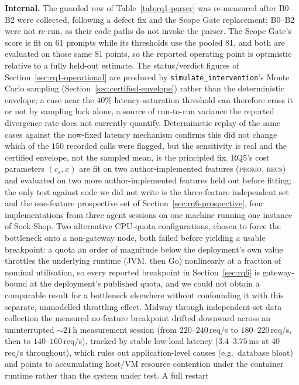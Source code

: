 \documentclass[journal, 10pt]{IEEEtran}
\begin{document}
\textbf{Internal.} The guarded row of Table~\ref{tab:rq1-parser} was re-measured after
B0--B2 were collected, following a defect fix and the Scope Gate replacement;
B0--B2 were not re-run, as their code paths do not invoke the parser. The Scope
Gate's score is fit on 61 prompts while its thresholds use the pooled 81, and
both are evaluated on those same 81 points, so the reported operating point is
optimistic relative to a fully held-out estimate. The status/verdict figures of
Section~\ref{sec:rq1-operational} are produced by \texttt{simulate\_intervention}'s
Monte Carlo sampling (Section~\ref{sec:certified-envelope}) rather than the
deterministic envelope; a case near the $40\%$ latency-saturation threshold can
therefore cross it or not by sampling luck alone, a source of run-to-run
variance the reported divergence rate does not currently quantify. Deterministic
replay of the same cases against the now-fixed latency mechanism confirms this
did not change which of the $150$ recorded calls were flagged, but the
sensitivity is real and the certified envelope, not the sampled mean, is the
principled fix. RQ5's cost parameters $(c_s, x)$ are fit on two
author-implemented features (\textsc{promo}, \textsc{recs}) and evaluated on
two more author-implemented features held out before fitting; the only test
against code we did not write is the three-feature independent set and the
one-feature prospective set of Section~\ref{sec:rq6-prospective}, four
implementations from three agent sessions on one machine running one instance
of Sock Shop. Two alternative CPU-quota configurations, chosen to force the
bottleneck onto a non-gateway node, both failed before yielding a usable
breakpoint: a quota an order of magnitude below the deployment's own value
throttles the underlying runtime (JVM, then Go) nonlinearly at a fraction of
nominal utilisation, so every reported breakpoint in Section~\ref{sec:rq6} is
gateway-bound at the deployment's published quota, and we could not obtain a
comparable result for a bottleneck elsewhere without confounding it with this
separate, unmodelled throttling effect.
\label{sec:drift-threat}
Midway through independent-set data collection the measured no-feature
breakpoint drifted downward across an uninterrupted $\sim\!21\,$h measurement
session (from $220$--$240\,$req/s to $180$--$220\,$req/s, then to
$140$--$160\,$req/s), tracked by stable low-load latency ($3.4$--$3.75\,$ms at
$40\,$req/s throughout), which rules out application-level causes
(e.g.\ database bloat) and points to accumulating host/VM resource contention
under the container runtime rather than the system under test. A full restart
\end{document}

